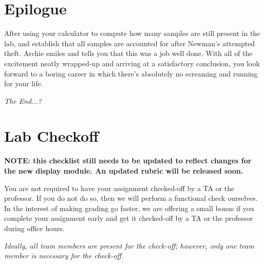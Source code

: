 \section*{Epilogue}

After using your calculator to compute how many samples are still present in the lab, and establish that all samples are accounted for after Newman's attempted theft. Archie smiles and tells you that this was a job well done. With all of the excitement neatly wrapped-up and arriving at a satisfactory conclusion, you look forward to a boring career in which there's absolutely no screaming and running for your life.

\textit{The End...?}

\newpage\appendix

\section{Lab Checkoff}

\textbf{NOTE: this checklist still needs to be updated to reflect changes for the new display module. An updated rubric will be released soon.}

You are not required to have your assignment checked-off by a TA or the
professor. If you do not do so, then we will perform a functional check
ourselves. In the interest of making grading go faster, we are offering a small
bonus %
if you complete your assignment early and get it checked-off by a TA or the
professor during office hours.

\textit{Ideally, all team members are present for the check-off; however, only
one team member is necessary for the check-off.}

